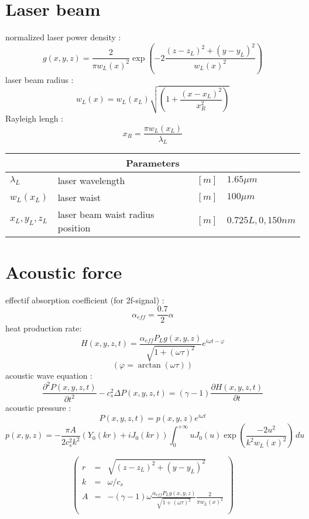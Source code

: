 \documentclass[12pt]{article}
\begin{document}
\setlength{\parindent}{0pt}

\section{Laser beam}

normalized laser power density :
$$g(x,y,z) = \frac{2}{\pi w_L(x)^2} \exp \left( -2 \frac{(z-z_L)^2+(y-y_L)^2}{w_L(x)^2}  \right)$$
laser beam radius :
$$w_L(x) = w_L(x_L) \sqrt{ \left( 1 + \frac{(x-x_L)^2}{x_R^2}  \right)}$$
Rayleigh lengh :
$$ x_R = \frac{\pi w_L(x_L)}{\lambda_L} $$

\begin{tabular}{|p{2cm}||p{6cm}|p{1cm}|p{3cm}| }
  \hline
  \multicolumn{4}{|c|}{Parameters} \\
  \hline
  $\lambda_L$ & laser wavelength & $[m]$ & $1.65 \mu m$ \\
  $w_L(x_L)$ & laser waist & $[m]$ & $100 \mu m$\\
  $x_L, y_L, z_L$ & laser beam waist radius position & $[m]$ & $0.725L,0,150nm$\\
  \hline
\end{tabular}

\newpage

\section{Acoustic force}

effectif absorption coefficient (for 2f-signal) :
$$\alpha_{eff}=\frac{0.7}{2}\alpha$$
heat production rate:
$$H(x,y,z,t) = \frac{\alpha_{eff} P_L g(x,y,z)}{\sqrt{1+(\omega \tau)^2}} e^{i \omega t - \varphi}$$
$$\left( \varphi = \arctan{(\omega \tau)} \right)$$
acoustic wave equation :
$$\frac{\partial^2 P(x,y,z,t)}{\partial t^2} - c_s^2 \Delta P(x,y,z,t) = (\gamma -1)\frac{\partial H(x,y,z,t)}{\partial t}$$
acoustic pressure :
$$P(x,y,z,t) = p(x,y,z)e^{i \omega t}$$
$$ p(x,y,z) = - \frac{\pi A}{2c_s^2k^2}(Y_0(kr)+iJ_0(kr)) \int_0^{+\infty}uJ_0(u)\exp{\left(\frac{-2u^2}{k^2w_L(x)^2}\right)} \,du $$

$$
\left(
\begin{array}{ccl}
 r & = & \sqrt{(z-z_L)^2+(y-y_L)^2}  \\
 k & = & \omega/c_s  \\
 A & = & -(\gamma -1) \omega \frac{\alpha_{eff} P_L g(x,y,z)}{\sqrt{1+(\omega \tau)^2}} \frac{2}{\pi w_L(x)^2} \\
\end{array}
\right)
$$ 
\end{document}
